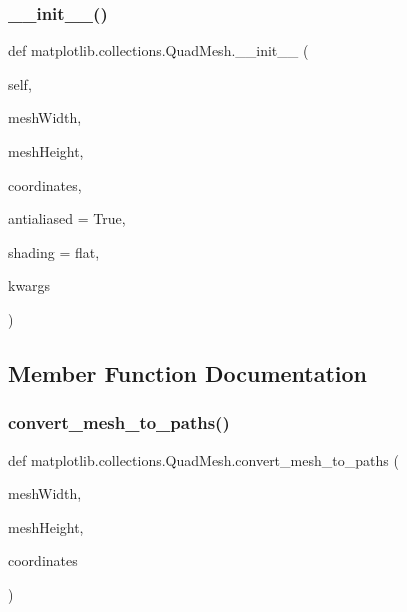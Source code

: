 \subsubsection{\texorpdfstring{\+\_\+\+\_\+init\+\_\+\+\_\+()}{\_\_init\_\_()}}
{\footnotesize\ttfamily def matplotlib.\+collections.\+Quad\+Mesh.\+\_\+\+\_\+init\+\_\+\+\_\+ (\begin{DoxyParamCaption}\item[{}]{self,  }\item[{}]{mesh\+Width,  }\item[{}]{mesh\+Height,  }\item[{}]{coordinates,  }\item[{}]{antialiased = {\ttfamily True},  }\item[{}]{shading = {\ttfamily \textquotesingle{}flat\textquotesingle{}},  }\item[{}]{kwargs }\end{DoxyParamCaption})}



\subsection{Member Function Documentation}
\mbox{\label{classmatplotlib_1_1collections_1_1QuadMesh_a1c6682558e4b0c0711c3201b1d0338a9}} 
\subsubsection{\texorpdfstring{convert\+\_\+mesh\+\_\+to\+\_\+paths()}{convert\_mesh\_to\_paths()}}
{\footnotesize\ttfamily def matplotlib.\+collections.\+Quad\+Mesh.\+convert\+\_\+mesh\+\_\+to\+\_\+paths (\begin{DoxyParamCaption}\item[{}]{mesh\+Width,  }\item[{}]{mesh\+Height,  }\item[{}]{coordinates }\end{DoxyParamCaption})\hspace{0.3cm}{\ttfamily [static]}}

